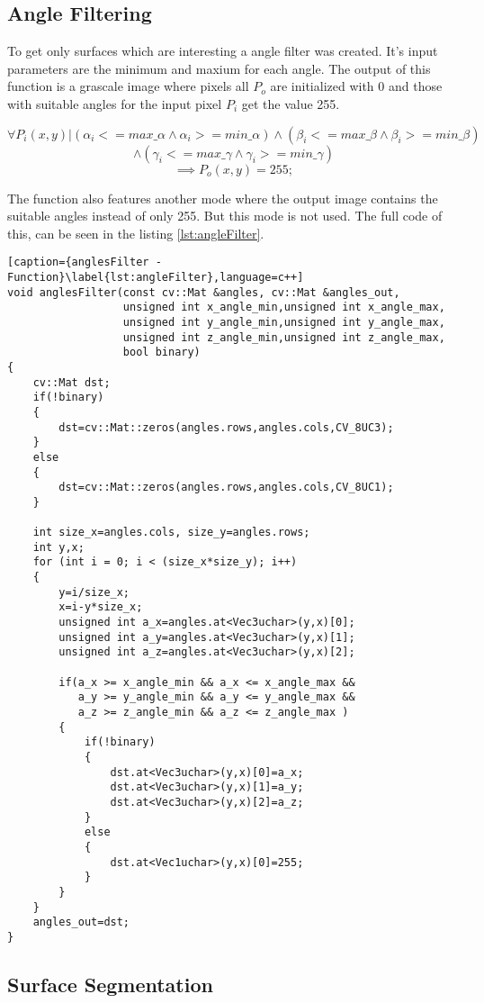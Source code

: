 \subsection{Angle Filtering}

To get only surfaces which are interesting a angle filter was created. It's input parameters
are the minimum and maxium for each angle. The output of this function is a grascale image
where pixels all $P_o$ are initialized with 0 and those with suitable angles 
for the input pixel $P_i$ get the value 255.

 \[
 	\forall P_i(x,y) | (\alpha_i<=max\_\alpha \wedge \alpha_i>=min\_\alpha) \wedge
 	(\beta_i<=max\_\beta \wedge \beta_i>=min\_\beta) \]\[ \wedge (\gamma_i<=max\_\gamma \wedge \gamma_i>=min\_\gamma)
 \]\[
 	\implies P_o(x,y) = 255;
 \] 

The function also features another mode where the output image contains the suitable angles instead of only 255.
But this mode is not used. The full code of this, can be seen in the listing \vref{lst:angleFilter}.

\begin{lstlisting}[caption={anglesFilter - Function}\label{lst:angleFilter},language=c++]
void anglesFilter(const cv::Mat &angles, cv::Mat &angles_out, 
                  unsigned int x_angle_min,unsigned int x_angle_max,
                  unsigned int y_angle_min,unsigned int y_angle_max,
                  unsigned int z_angle_min,unsigned int z_angle_max, 
                  bool binary)
{
	cv::Mat dst;
	if(!binary)
	{
		dst=cv::Mat::zeros(angles.rows,angles.cols,CV_8UC3);
	}
	else
	{
		dst=cv::Mat::zeros(angles.rows,angles.cols,CV_8UC1);
	}

	int size_x=angles.cols, size_y=angles.rows;
	int y,x;
	for (int i = 0; i < (size_x*size_y); i++)
	{
		y=i/size_x;
		x=i-y*size_x;
		unsigned int a_x=angles.at<Vec3uchar>(y,x)[0];
		unsigned int a_y=angles.at<Vec3uchar>(y,x)[1];
		unsigned int a_z=angles.at<Vec3uchar>(y,x)[2];

		if(a_x >= x_angle_min && a_x <= x_angle_max && 
	 	   a_y >= y_angle_min && a_y <= y_angle_max && 
	 	   a_z >= z_angle_min && a_z <= z_angle_max )
		{
			if(!binary)
			{
				dst.at<Vec3uchar>(y,x)[0]=a_x;
				dst.at<Vec3uchar>(y,x)[1]=a_y;
				dst.at<Vec3uchar>(y,x)[2]=a_z;
			}
			else
			{
				dst.at<Vec1uchar>(y,x)[0]=255;
			}
		}
	}
	angles_out=dst;
}
\end{lstlisting}



\subsection{Surface Segmentation}

